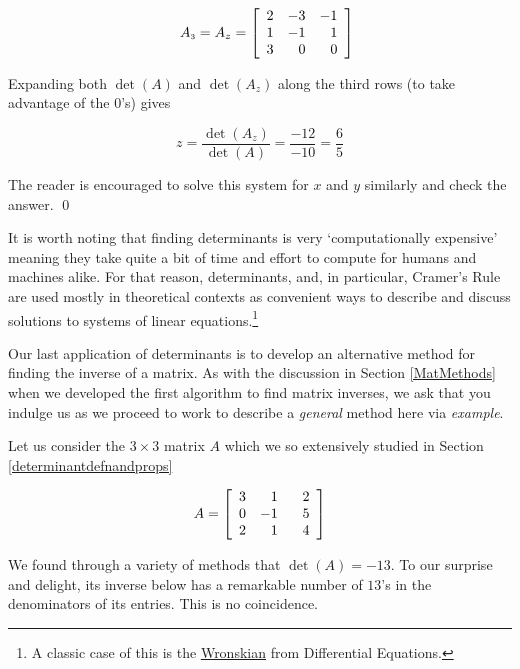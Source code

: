\documentclass{ximera}
\begin{document}
\begin{ex}
\begin{enumerate}
\[\begin{array}{cccc}
&

A_{\mbox{\tiny$3$}} = A_{z} =  \left[ \begin{array}{rrr} 2 & -3 & -1 \\ 1 & -1 & 1 \\ 3 & 0 & 0 \end{array} \right] \\

\end{array} \]

Expanding both $\det(A)$ and $\det\left(A_{z}\right)$ along the third rows (to take advantage of the $0$'s) gives

\[ z = \dfrac{\det\left(A_{z}\right)}{\det(A)} = \dfrac{-12}{-10} = \dfrac{6}{5} \]

The reader is encouraged to solve this system for $x$ and $y$ similarly and check the answer.  \qed

\end{enumerate}

\end{ex}

It is worth noting that finding determinants is very `computationally expensive' meaning they take quite a bit of time and effort to compute for humans and machines alike.  For that reason, determinants, and, in particular, Cramer's Rule are used mostly in theoretical contexts as convenient ways to describe and discuss solutions to systems of linear equations.\footnote{A classic case of this is the \href{https://en.wikipedia.org/wiki/Wronskian}{\underline{Wronskian}} from Differential Equations.}

\smallskip

Our last application of determinants is to develop an alternative method for finding the inverse of a matrix. As with the discussion in Section \ref{MatMethods} when we developed the first algorithm to find matrix inverses, we ask that you indulge us as we proceed to work to describe a \textit{general} method here via \textit{example}. 

Let us consider the $3 \times 3$ matrix $A$ which we so extensively studied in Section \ref{determinantdefnandprops}

\[A = \left[ \begin{array}{rrr} 3 & 1 & \hphantom{-}2 \\ 0 & -1 & 5 \\ 2 & 1 & 4 \\ \end{array} \right]\]

We found through a variety of methods that $\det(A) = -13$.  To our surprise and delight, its inverse below has a remarkable number of $13$'s in the denominators of its entries. This is no coincidence.
\end{document}
